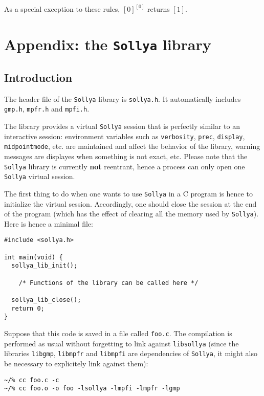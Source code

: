 \documentclass[a4paper]{article}
\newcommand{\sollya}{\texttt{Sollya}\xspace}
\begin{document}
As a special exception to these rules, $[0]^{[0]}$ returns $[1]$.

\newpage
\section{Appendix: the \sollya library}
\label{Libsollya}
 \subsection{Introduction}
The header file of the \sollya library is \texttt{sollya.h}. It automatically includes \texttt{gmp.h}, \texttt{mpfr.h} and \texttt{mpfi.h}.

The library provides a virtual \sollya session that is perfectly similar to an interactive session: environment variables such as \texttt{verbosity}, \texttt{prec}, \texttt{display}, \texttt{midpointmode}, etc. are maintained and affect the behavior of the library, warning messages are displayes when something is not exact, etc. Please note that the \sollya library is currently \textbf{not} reentrant, hence a process can only open one \sollya virtual session.

The first thing to do when one wants to use \sollya in a C program is hence to initialize the virtual session. Accordingly, one should close the session at the end of the program (which has the effect of clearing all the memory used by \sollya). Here is hence a minimal file:

\begin{center}\begin{minipage}{15cm}\begin{Verbatim}[frame=single]
#include <sollya.h>

int main(void) {
  sollya_lib_init();

    /* Functions of the library can be called here */

  sollya_lib_close();
  return 0;
}
\end{Verbatim}
\end{minipage}\end{center}

Suppose that this code is saved in a file called \texttt{foo.c}. The compilation is performed as usual without forgetting to link against \texttt{libsollya} (since the libraries \texttt{libgmp}, \texttt{libmpfr} and \texttt{libmpfi} are dependencies of \sollya, it might also be necessary to explicitely link against them):
\begin{center}\begin{minipage}{15cm}\begin{Verbatim}[frame=single]
~/% cc foo.c -c
~/% cc foo.o -o foo -lsollya -lmpfi -lmpfr -lgmp
\end{Verbatim}
\end{minipage}\end{center}
\end{document}
